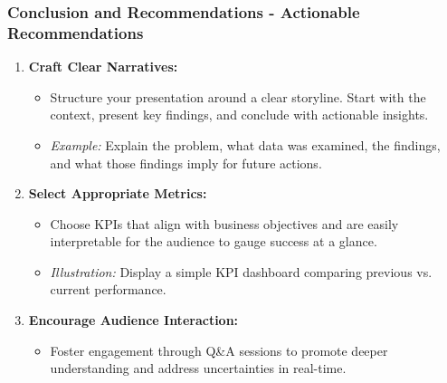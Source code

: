 \documentclass{beamer}
\begin{document}
\begin{frame}[fragile]
    \frametitle{Conclusion and Recommendations - Actionable Recommendations}
    \begin{enumerate}
        \item \textbf{Craft Clear Narratives:}
        \begin{itemize}
            \item Structure your presentation around a clear storyline. Start with the context, present key findings, and conclude with actionable insights.
            \item \textit{Example:} Explain the problem, what data was examined, the findings, and what those findings imply for future actions.
        \end{itemize}

        \item \textbf{Select Appropriate Metrics:}
        \begin{itemize}
            \item Choose KPIs that align with business objectives and are easily interpretable for the audience to gauge success at a glance.
            \item \textit{Illustration:} Display a simple KPI dashboard comparing previous vs. current performance.
        \end{itemize}

        \item \textbf{Encourage Audience Interaction:}
        \begin{itemize}
            \item Foster engagement through Q\&A sessions to promote deeper understanding and address uncertainties in real-time.
        \end{itemize}
    \end{enumerate}
\end{frame}
\end{document}
